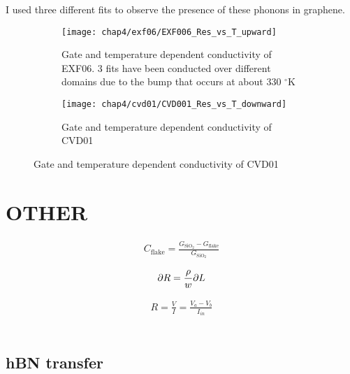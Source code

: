 \documentclass[../Matt_Gebert_Honours_Thesis.tex]{subfiles}
\begin{document}
I used three different fits to observe the presence of these phonons in graphene.
\begin{figure}[H]
	\begin{subfigure}[b]{0.5\textwidth}
		\centering
		\texttt{[image: chap4/exf06/EXF006\_Res\_vs\_T\_upward]}
		\caption[EXF06 temperature dependent conductivity]{Gate and temperature dependent conductivity of EXF06. 3 fits have been conducted over different domains due to the bump that occurs at about 330 $^\circ$K}
	\end{subfigure}
	\begin{subfigure}[b]{0.5\textwidth}
		\centering
		\texttt{[image: chap4/cvd01/CVD001\_Res\_vs\_T\_downward]}
		\caption[CVD01 temperature dependent conductivity]{Gate and temperature dependent conductivity of CVD01}
	\end{subfigure}
\end{figure}






\section{OTHER}
\begin{align}
	C_{\text{flake}} = \frac{G_{\text{SiO}_2}-G_{\text{flake}}}{G_{\text{SiO}_2}}
\end{align}

\begin{align}
	\partial R = \frac{\rho}{w} \partial L
\end{align}

\begin{align}
	R = \frac{V}{I} = \frac{V_a-V_b}{I_{in}}
\end{align}




\begin{align}
\end{align}

\subsection{hBN transfer}
\end{document}
